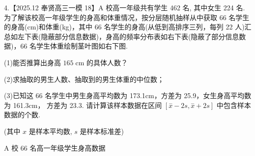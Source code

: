 \documentclass[10pt]{article}
\begin{document}
4.【2025.12 奉贤高三一模 18】A 校高一年级共有学生 462 名, 其中女生 224 名. 为了解该校高一年级学生的身高和体重情况，按分层随机抽样从中获取 66 名学生的身高(cm)和体重(kg)，其中 66 名学生的身高(从低到高排序三列，每列 22 人)汇总如左下表(隐蔽部分信息数据)，身高的频率分布表如右下表(隐蔽了部分信息数据)，66 名学生体重绘制茎叶图如右下图.

(1)能否推算出身高 \({165}\mathrm{\;{cm}}\) 的具体人数？

(2)求抽取的男生人数、抽取到的男生体重的中位数；

(3)已知这 66 名学生中男生身高平均数为 173.1cm，方差为 25.9，女生身高平均数为 161.3cm， 方差为 23.3. 请计算该样本数据在区间 \(\left\lbrack  {\overset{ - }{x} - {2s},\overset{ - }{x} + {2s}}\right\rbrack\) 中包含样本数据的个数.

(其中 \(x\) 是样本平均数, \(s\) 是样本标准差)

A 校 66 名高一年级学生身高数据
\end{document}
